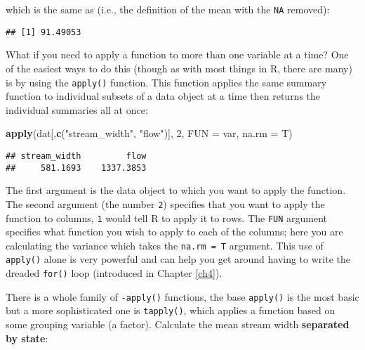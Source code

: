 \documentclass[]{book}
\newenvironment{Shaded}{\begin{snugshade}}{\end{snugshade}}
\newcommand{\DataTypeTok}[1]{\textcolor[rgb]{0.13,0.29,0.53}{#1}}
\newcommand{\DecValTok}[1]{\textcolor[rgb]{0.00,0.00,0.81}{#1}}
\newcommand{\KeywordTok}[1]{\textcolor[rgb]{0.13,0.29,0.53}{\textbf{#1}}}
\newcommand{\NormalTok}[1]{#1}
\newcommand{\OperatorTok}[1]{\textcolor[rgb]{0.81,0.36,0.00}{\textbf{#1}}}
\newcommand{\StringTok}[1]{\textcolor[rgb]{0.31,0.60,0.02}{#1}}
\begin{document}
which is the same as (i.e., the definition of the mean with the \texttt{NA} removed):

\begin{Shaded}
\end{Shaded}

\begin{verbatim}
## [1] 91.49053
\end{verbatim}

What if you need to apply a function to more than one variable at a time? One of the easiest ways to do this (though as with most things in R, there are many) is by using the \texttt{apply()} function. This function applies the same summary function to individual subsets of a data object at a time then returns the individual summaries all at once:

\begin{Shaded}
\begin{Highlighting}[]
\KeywordTok{apply}\NormalTok{(dat[,}\KeywordTok{c}\NormalTok{(}\StringTok{"stream_width"}\NormalTok{, }\StringTok{"flow"}\NormalTok{)], }\DecValTok{2}\NormalTok{, }\DataTypeTok{FUN =}\NormalTok{ var, }\DataTypeTok{na.rm =}\NormalTok{ T)}
\end{Highlighting}
\end{Shaded}

\begin{verbatim}
## stream_width         flow 
##     581.1693    1337.3853
\end{verbatim}

The first argument is the data object to which you want to apply the function. The second argument (the number \texttt{2}) specifies that you want to apply the function to columns, \texttt{1} would tell R to apply it to rows. The \texttt{FUN} argument specifies what function you wish to apply to each of the columns; here you are calculating the variance which takes the \texttt{na.rm\ =\ T} argument. This use of \texttt{apply()} alone is very powerful and can help you get around having to write the dreaded \texttt{for()} loop (introduced in Chapter \ref{ch4}).

There is a whole family of \texttt{-apply()} functions, the base \texttt{apply()} is the most basic but a more sophisticated one is \texttt{tapply()}, which applies a function based on some grouping variable (a factor). Calculate the mean stream width \textbf{separated by state}:
\end{document}
